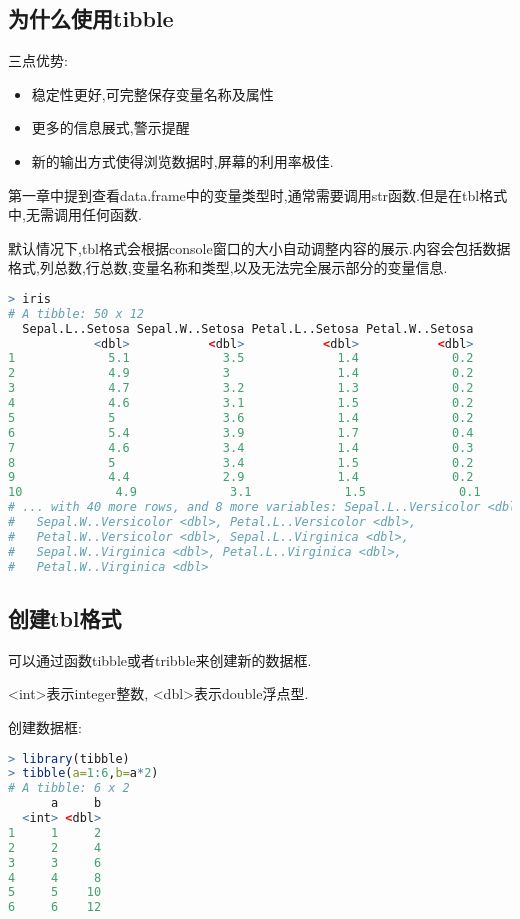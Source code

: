 \documentclass[11pt,a4paper,oneside]{book}
\begin{document}
\subsection{为什么使用tibble}
三点优势:
\begin{itemize}
	\item 稳定性更好,可完整保存变量名称及属性
	\item 更多的信息展式,警示提醒
	\item 新的输出方式使得浏览数据时,屏幕的利用率极佳.
\end{itemize}

第一章中提到查看data.frame中的变量类型时,通常需要调用str函数.但是在tbl格式中,无需调用任何函数.

默认情况下,tbl格式会根据console窗口的大小自动调整内容的展示.内容会包括数据格式,列总数,行总数,变量名称和类型,以及无法完全展示部分的变量信息.
\begin{lstlisting}[language=r]
> iris
# A tibble: 50 x 12
  Sepal.L..Setosa Sepal.W..Setosa Petal.L..Setosa Petal.W..Setosa
            <dbl>           <dbl>           <dbl>           <dbl>
1             5.1             3.5             1.4             0.2
2             4.9             3               1.4             0.2
3             4.7             3.2             1.3             0.2
4             4.6             3.1             1.5             0.2
5             5               3.6             1.4             0.2
6             5.4             3.9             1.7             0.4
7             4.6             3.4             1.4             0.3
8             5               3.4             1.5             0.2
9             4.4             2.9             1.4             0.2
10             4.9             3.1             1.5             0.1
# ... with 40 more rows, and 8 more variables: Sepal.L..Versicolor <dbl>,
#   Sepal.W..Versicolor <dbl>, Petal.L..Versicolor <dbl>,
#   Petal.W..Versicolor <dbl>, Sepal.L..Virginica <dbl>,
#   Sepal.W..Virginica <dbl>, Petal.L..Virginica <dbl>,
#   Petal.W..Virginica <dbl>
\end{lstlisting}

\subsection{创建tbl格式}
可以通过函数tibble或者tribble来创建新的数据框.

<int>表示integer整数, <dbl>表示double浮点型.

创建数据框:
\begin{lstlisting}[language=r]
> library(tibble)
> tibble(a=1:6,b=a*2)
# A tibble: 6 x 2
      a     b
  <int> <dbl>
1     1     2
2     2     4
3     3     6
4     4     8
5     5    10
6     6    12
\end{lstlisting}
\end{document}

